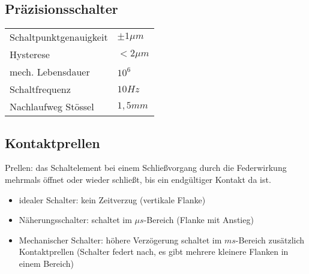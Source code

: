 \subsection{Präzisionsschalter}
\begin{tabular}{l l}
Schaltpunktgenauigkeit & $\pm 1 \unit{\mu m}$\\
Hysterese & $< 2 \unit{\mu m}$\\
mech. Lebensdauer & $10^6$\\
Schaltfrequenz & $10 \unit{Hz}$\\
Nachlaufweg Stössel & $1,5\unit{mm}$
\end{tabular}
\subsection{Kontaktprellen}
Prellen: das Schaltelement bei einem Schließvorgang durch die Federwirkung mehrmals öffnet oder wieder schließt, bis ein endgültiger Kontakt da ist.
\begin{itemize}
\item idealer Schalter: kein Zeitverzug (vertikale Flanke)
\item Näherungsschalter: schaltet im $\unit{\mu s}$-Bereich (Flanke mit Anstieg)
\item Mechanischer Schalter: höhere Verzögerung schaltet im $\unit{ms}$-Bereich zusätzlich Kontaktprellen (Schalter federt nach, es gibt mehrere kleinere Flanken in einem Bereich)
\end{itemize}
